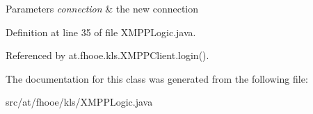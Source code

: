 \begin{DoxyParams}{Parameters}
{\em connection} & the new connection \\
\hline
\end{DoxyParams}


Definition at line 35 of file X\-M\-P\-P\-Logic.\-java.



Referenced by at.\-fhooe.\-kls.\-X\-M\-P\-P\-Client.\-login().



The documentation for this class was generated from the following file\-:\begin{DoxyCompactItemize}
\item 
src/at/fhooe/kls/X\-M\-P\-P\-Logic.\-java\end{DoxyCompactItemize}
